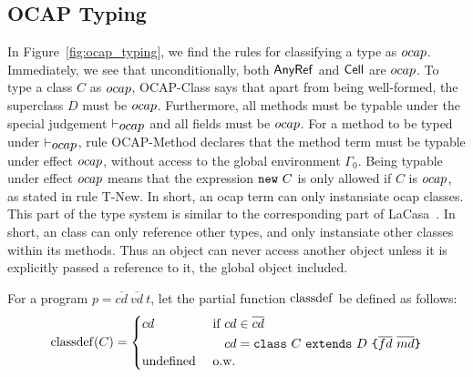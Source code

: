 \subsection{OCAP Typing}%
\label{sub:ocap_typing}

In Figure~\ref{fig:ocap_typing}, we find the rules for classifying a type as $\mbox{$ocap$}$.
Immediately, we see that unconditionally, both $\mbox{$\mathsf{AnyRef}$}$ and $\mbox{$\mathsf{Cell}$}$ are
$\mbox{$ocap$}$. To type a class $C$ as $\mbox{$ocap$}$, {\sc OCAP-Class} says that apart from being
well-formed, the superclass $D$ must be $\mbox{$ocap$}$. Furthermore, all methods must
be typable under the special judgement $\vdash_{\mbox{$ocap$}}$ and all fields must be
$\mbox{$ocap$}$.  For a method to be typed under $\vdash_{\mbox{$ocap$}}$, rule {\sc
OCAP-Method} declares that the method term must be typable under effect $\mbox{$ocap$}$,
without access to the global environment $\Gamma_0$. Being typable under effect
$\mbox{$ocap$}$ means that the expression $\mbox{\mdseries\texttt{new}~$C$}$ is only allowed if $C$ is $\mbox{$ocap$}$, as
stated in rule {\sc T-New}. In short, an ocap term can only instansiate ocap
classes. This part of the type system is similar to the corresponding part of
LaCasa~\parencite{conf/oopsla/HallerL16}. In short, an \ocap{} class can only
reference other \ocap{} types, and only instansiate other \ocap{} classes within
its methods. Thus an \ocap{} object can never access another object unless it is
explicitly passed a reference to it, the global object included.

\begin{definition}
  For a program $p = \overline{cd}~\overline{vd}~t$, let the partial function
  $\mbox{$\mathrm{classdef}$}$ be defined as follows:
  \begin{equation*}
    \mbox{$\mathrm{classdef}$}(C) = \begin{cases}
      cd & 
      \begin{aligned}[t]
        \text{ if } &cd \in \overline{cd} \\
        &cd = \mbox{\mdseries\texttt{class}~$C$~\texttt{extends}~$D$~\texttt{\{}$\overline{fd}$~$\overline{md}$\texttt{\}}}
      \end{aligned} \\
      \text{undefined} & \text{ o.w.}
    \end{cases}
  \end{equation*}
\end{definition}

